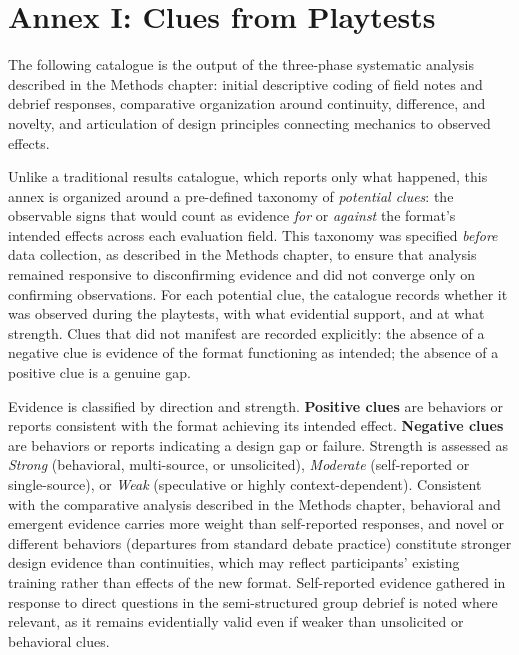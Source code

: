 \section*{Annex I: Clues from Playtests}

The following catalogue is the output of the three-phase systematic analysis described in the Methods chapter: initial descriptive coding of field notes and debrief responses, comparative organization around continuity, difference, and novelty, and articulation of design principles connecting mechanics to observed effects.

Unlike a traditional results catalogue, which reports only what happened, this annex is organized around a pre-defined taxonomy of \textit{potential clues}: the observable signs that would count as evidence \textit{for} or \textit{against} the format's intended effects across each evaluation field. This taxonomy was specified \textit{before} data collection, as described in the Methods chapter, to ensure that analysis remained responsive to disconfirming evidence and did not converge only on confirming observations. For each potential clue, the catalogue records whether it was observed during the playtests, with what evidential support, and at what strength. Clues that did not manifest are recorded explicitly: the absence of a negative clue is evidence of the format functioning as intended; the absence of a positive clue is a genuine gap.

Evidence is classified by direction and strength. \textbf{Positive clues} are behaviors or reports consistent with the format achieving its intended effect. \textbf{Negative clues} are behaviors or reports indicating a design gap or failure. Strength is assessed as \textit{Strong} (behavioral, multi-source, or unsolicited), \textit{Moderate} (self-reported or single-source), or \textit{Weak} (speculative or highly context-dependent). Consistent with the comparative analysis described in the Methods chapter, behavioral and emergent evidence carries more weight than self-reported responses, and novel or different behaviors (departures from standard debate practice) constitute stronger design evidence than continuities, which may reflect participants' existing training rather than effects of the new format. Self-reported evidence gathered in response to direct questions in the semi-structured group debrief is noted where relevant, as it remains evidentially valid even if weaker than unsolicited or behavioral clues.

